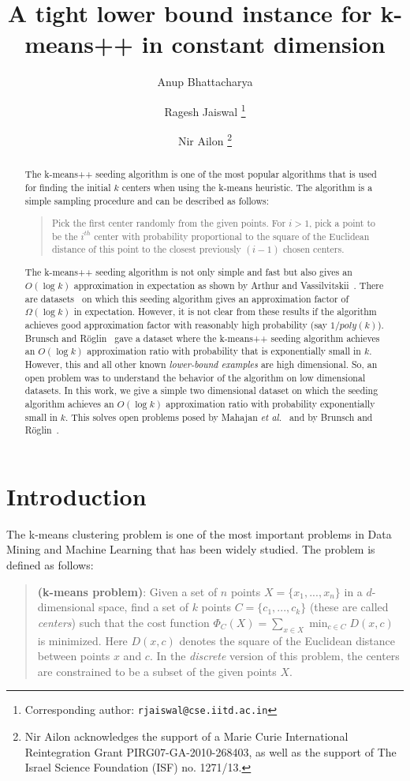\documentclass[11pt]{article}
\title{A tight lower bound instance for k-means++ in constant dimension}
\author[1]{Anup Bhattacharya}
\author[1]{Ragesh Jaiswal \thanks{Corresponding author: \texttt{rjaiswal@cse.iitd.ac.in}}}
\author[2]{Nir Ailon \thanks{Nir Ailon acknowledges the support of a Marie Curie International Reintegration Grant PIRG07-GA-2010-268403, as well as the support of The Israel Science Foundation (ISF) no. 1271/13.}}
\affil[1]{IIT Delhi, India}
\affil[2]{Technion, Haifa, Israel}
\date{}
\newcommand{\etal}{{\it et al.}}
\begin{document}
\maketitle
\begin{abstract}
The k-means++ seeding algorithm is one of the most popular algorithms that is used for finding the initial $k$ centers when using the k-means heuristic. The algorithm is a simple sampling procedure and can be described as follows: 
\begin{quote}
Pick the first center randomly from the given points. 
For $i > 1$, pick a point to be the $i^{th}$ center with probability proportional to the square of the Euclidean distance of this point to the closest previously $(i-1)$ chosen centers.
\end{quote}
The k-means++ seeding algorithm is not only simple and fast but also gives an $O(\log{k})$ approximation in expectation as shown by Arthur and Vassilvitskii~\cite{ArthurV07}.
There are datasets~\cite{ArthurV07,AggarwalDK09} on which this seeding algorithm gives an approximation factor of $\Omega(\log{k})$ in expectation. 
However, it is not clear from these results if the algorithm achieves good approximation factor with reasonably high probability (say $1/poly(k)$). 
Brunsch and R\"{o}glin~\cite{br12} gave a dataset where the k-means++ seeding algorithm achieves an  $O(\log{k})$ approximation ratio with probability that is exponentially small in $k$. 
However, this and all other known {\em lower-bound examples} \cite{ArthurV07,AggarwalDK09} are high dimensional. 
So, an open problem was to understand the behavior of the algorithm on low dimensional datasets. 
In this work, we give a simple two dimensional dataset on which the seeding algorithm achieves an $O(\log{k})$ approximation ratio with probability exponentially small in $k$. 
This solves open problems posed by Mahajan \etal~\cite{mnv12} and by Brunsch and R\"{o}glin~\cite{br12}.
\end{abstract}



\section{Introduction}

The k-means clustering problem is one of the most important problems in Data Mining and Machine Learning that has been widely studied. The problem is defined as follows:
\begin{quote}
{\bf (k-means problem)}: Given a set of $n$ points $X = \{x_1, ..., x_n\}$ in a $d$-dimensional space, find a set of $k$ points $C = \{c_1, ..., c_k\}$ (these are called {\em centers}) such that the cost function $\Phi_{C}(X) = \sum_{x \in X} \min_{c \in C} D(x, c)$ is minimized. 
Here $D(x,c)$ denotes the square of the Euclidean distance between points $x$ and $c$.
In the {\em discrete} version of this problem, the centers are constrained to be a subset of the given points $X$.
\end{quote}
\end{document}

